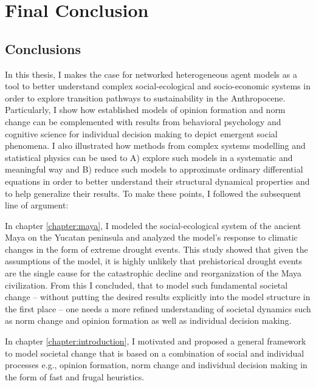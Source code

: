 \chapter{Final Conclusion}

\section{Conclusions}

In this thesis, I makes the case for networked heterogeneous agent models as a tool to better understand complex social-ecological and socio-economic systems in order to explore transition pathways to sustainability in the Anthropocene. 
Particularly, I show how established models of opinion formation and norm change can be complemented with results from behavioral psychology and cognitive science for individual decision making to depict emergent social phenomena.
I also illustrated how methods from complex systems modelling and statistical physics can be used to A) explore such models in a systematic and meaningful way and B) reduce such models to approximate ordinary differential equations in order to better understand their structural dynamical properties and to help generalize their results.
To make these points, I followed the subsequent line of argument:

In chapter \ref{chapter:maya}, I modeled the social-ecological system of the ancient Maya on the Yucatan peninsula and analyzed the model's response to climatic changes in the form of extreme drought events.
This study showed that given the assumptions of the model, it is highly unlikely that prehistorical drought events are the single cause for the catastrophic decline and reorganization of the Maya civilization.
From this I concluded, that to model such fundamental societal change -- without putting the desired results explicitly into the model structure in the first place -- one needs a more refined understanding of societal dynamics such as norm change and opinion formation as well as individual decision making.

In chapter \ref{chapter:introduction}, I motivated and proposed a general framework to model societal change that is based on a combination of social and individual processes e.g., opinion formation, norm change and individual decision making in the form of fast and frugal heuristics.

